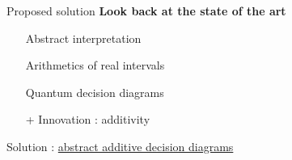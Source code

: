 \begin{frame}{Proposed solution}
    \textbf{Look back at the state of the art}
    \begin{itemize}
        \item[\checkmark] Abstract interpretation
        \item[\checkmark] Arithmetics of real intervals
        \item[\checkmark] Quantum decision diagrams
        \item[+] Innovation : additivity
    \end{itemize}

    \begin{center}
        Solution : \underline{abstract additive decision diagrams}
    \end{center}
\end{frame}
